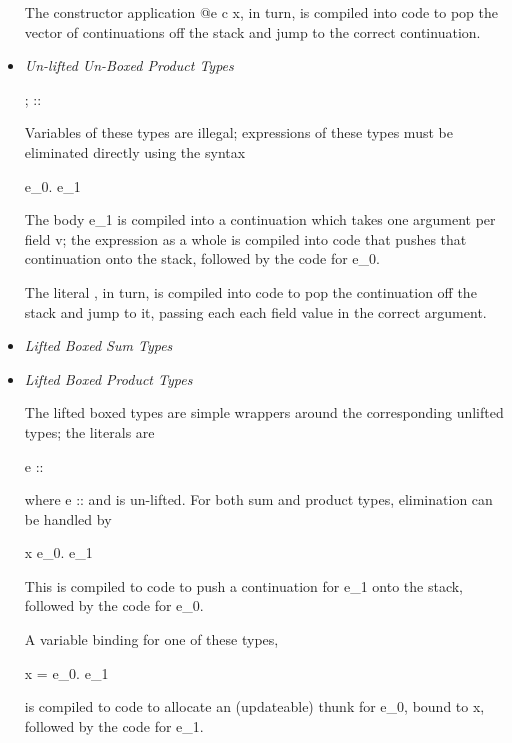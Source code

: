 \documentclass{report}
\newcommand\defn[1]{\emph{#1}}
\newcommand\for{\hskwd{for}}
\newcommand\crkwd[1]{\hskwd{"#1}}
\newcommand\crgroup[1]{\left\langle#1\right\rangle}
\newcommand\uconstr{\crkwd{uconstr}}
\newcommand\cruprod{\crkwd{u\Pi}}
\newcommand\lift[1]{\left\lfloor#1\right\rfloor}
\begin{document}
\begin{itemize}
        The constructor application \<\uconstr \tau @e c x\>, in turn,
        is compiled into code to pop the vector of continuations off the stack and
        jump to the correct continuation.

    \item \defn{Un-lifted Un-Boxed Product Types}

        \begin{haskell} \cruprod\crgroup{ ; } :: \cruprod\crgroup{  } \end{haskell}

        Variables of these types are illegal;
        expressions of these types must be eliminated directly using the syntax
        \begin{haskell} \for \cruprod\crgroup{  } \propto e_0. e_1 \end{haskell}
        The body \<e_1\> is compiled into a continuation which takes one argument per field \<v\>;
        the expression as a whole is compiled into code that pushes that continuation onto the stack,
        followed by the code for \<e_0\>.

        The literal \<\cruprod\crgroup{  }\>, in turn,
        is compiled into code to pop the continuation off the stack and jump to it,
        passing each each field value in the correct argument.

    \item \defn{Lifted Boxed Sum Types}
    \item \defn{Lifted Boxed Product Types}

        The lifted boxed types are simple wrappers around the corresponding unlifted types;
        the literals are
        \begin{haskell} \lift{e} :: \lift{\tau} \end{haskell}
        where \<e :: \tau\> and \<\tau\> is un-lifted.
        For both sum and product types, elimination can be handled by
        \begin{haskell} \for \lift{x} \propto e_0. e_1 \end{haskell}
        This is compiled to code to push a continuation for \<e_1\> onto the stack,
        followed by the code for \<e_0\>.

        A variable binding for one of these types,
        \begin{haskell} \for x = e_0. e_1 \end{haskell}
        is compiled to code to allocate an (updateable) thunk for \<e_0\>, bound to \<x\>,
        followed by the code for \<e_1\>.


\end{itemize}
\end{document}
